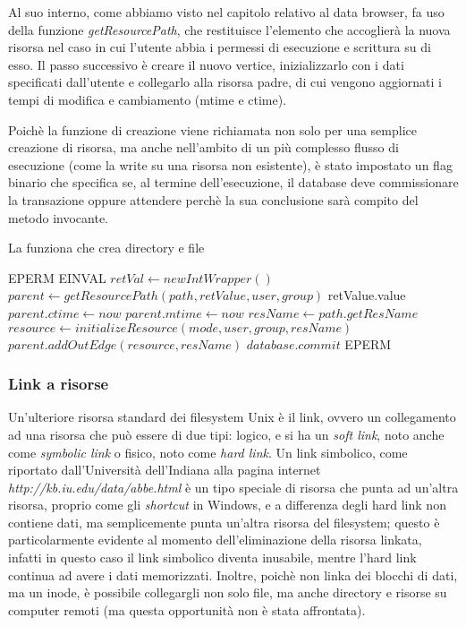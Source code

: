 Al suo interno, come abbiamo visto nel capitolo relativo al data browser, fa uso della funzione \emph{getResourcePath}, che restituisce l'elemento che accoglierà la nuova risorsa nel caso in cui l'utente abbia i permessi di esecuzione e scrittura su di esso. Il passo successivo è creare il nuovo vertice, inizializzarlo con i dati specificati dall'utente e collegarlo alla risorsa padre, di cui vengono aggiornati i tempi di modifica e cambiamento (mtime e ctime).

Poichè la funzione di creazione viene richiamata non solo per una semplice creazione di risorsa, ma anche nell'ambito di un più complesso flusso di esecuzione (come la write su una risorsa non esistente), è stato impostato un flag binario che specifica se, al termine dell'esecuzione, il database deve commissionare la transazione oppure attendere perchè la sua conclusione sarà compito del metodo invocante.
\begin{algorithm}
\begin{algorithmic}[5]
\caption{La funziona che crea directory e file}
		\State \Return EPERM
	\EndIf
		\State \Return EINVAL
	\EndIf
	\State $retVal \gets new IntWrapper()$
	\State $parent \gets getResourcePath(path, retValue, user, group)$
		\State \Return retValue.value
	\EndIf
		\State $parent.ctime \gets now$
		\State $parent.mtime \gets now$
		\State $resName \gets path.getResName$
		\State $resource \gets initializeResource(mode, user, group, resName)$
		\State $parent.addOutEdge(resource, resName)$
			\State $database.commit$
		\EndIf
	\Else
		\State \Return EPERM
	\EndIf
	\State {}
\EndFunction
\end{algorithmic}
\end{algorithm}

\subsubsection{Link a risorse}
Un'ulteriore risorsa standard dei filesystem Unix è il link, ovvero un collegamento ad una risorsa che può essere di due tipi: logico, e si ha un \emph{soft link}, noto anche come \emph{symbolic link} o fisico, noto come \emph{hard link}. Un link simbolico, come riportato dall'Università dell'Indiana alla pagina internet \emph{http://kb.iu.edu/data/abbe.html}
è un tipo speciale di risorsa che punta ad un'altra risorsa, proprio come gli \emph{shortcut} in Windows, e a differenza degli hard link non contiene dati, ma semplicemente punta un'altra risorsa del filesystem; questo è particolarmente evidente al momento dell'eliminazione della risorsa linkata, infatti in questo caso il link simbolico diventa inusabile, mentre l'hard link continua ad avere i dati memorizzati. Inoltre, poichè non linka dei blocchi di dati, ma un inode, è possibile collegargli non solo file, ma anche directory e risorse su computer remoti (ma questa opportunità non è stata affrontata).

